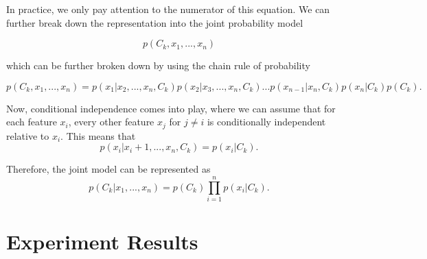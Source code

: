 \documentclass[11pt, letterpaper]{article}
\begin{document}
In practice, we only pay attention to the numerator of this equation. We can further break down the representation into the joint probability model

$$p(C_k, x_1,...,x_n)$$

which can be further broken down by using the chain rule of probability


$$p(C_k, x_1,..., x_n) = p(x_1 | x_2,...,x_n, C_k)p(x_2 | x_3,...,x_n, C_k)...p(x_{n-1} | x_n, C_k)p(x_n | C_k)p(C_k).$$ 

Now, conditional independence comes into play, where we can assume that for each feature $x_i$, every other feature $x_j$ for $j \neq i$ is conditionally independent relative to $x_i$. This means that 
$$p(x_i | x_i+1,...,x_n, C_k) = p(x_i | C_k).$$

Therefore, the joint model can be represented as $$p(C_k | x_1,...,x_n) = p(C_k) \prod_{i=1}^{n}p(x_i | C_k).$$

\section{Experiment Results}
\end{document}
